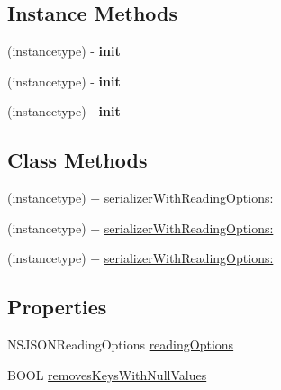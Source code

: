 \subsection*{Instance Methods}
\begin{DoxyCompactItemize}
\item 
\mbox{\label{interface_a_f_j_s_o_n_response_serializer_a05c10f46317a64479c52c870213479b8}} 
(instancetype) -\/ {\bfseries init}
\item 
\mbox{\label{interface_a_f_j_s_o_n_response_serializer_a05c10f46317a64479c52c870213479b8}} 
(instancetype) -\/ {\bfseries init}
\item 
\mbox{\label{interface_a_f_j_s_o_n_response_serializer_a05c10f46317a64479c52c870213479b8}} 
(instancetype) -\/ {\bfseries init}
\end{DoxyCompactItemize}
\subsection*{Class Methods}
\begin{DoxyCompactItemize}
\item 
(instancetype) + \mbox{\hyperlink{interface_a_f_j_s_o_n_response_serializer_a84c05ae2bc646684aa9cb39041687979}{serializer\+With\+Reading\+Options\+:}}
\item 
(instancetype) + \mbox{\hyperlink{interface_a_f_j_s_o_n_response_serializer_a84c05ae2bc646684aa9cb39041687979}{serializer\+With\+Reading\+Options\+:}}
\item 
(instancetype) + \mbox{\hyperlink{interface_a_f_j_s_o_n_response_serializer_a84c05ae2bc646684aa9cb39041687979}{serializer\+With\+Reading\+Options\+:}}
\end{DoxyCompactItemize}
\subsection*{Properties}
\begin{DoxyCompactItemize}
\item 
N\+S\+J\+S\+O\+N\+Reading\+Options \mbox{\hyperlink{interface_a_f_j_s_o_n_response_serializer_a344e139d77d63a22446f3c95990d2bce}{reading\+Options}}
\item 
B\+O\+OL \mbox{\hyperlink{interface_a_f_j_s_o_n_response_serializer_af7be2fbd6e630440952f10bf448569aa}{removes\+Keys\+With\+Null\+Values}}
\end{DoxyCompactItemize}


